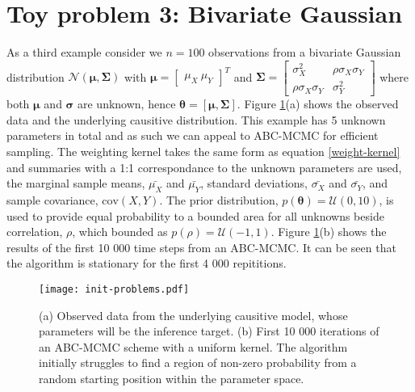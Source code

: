 \section{Toy problem 3: Bivariate Gaussian}
As a third example consider we $n = 100$ observations from a bivariate Gaussian distribution $\mathcal{N}(\bm{\mu},\bm{\Sigma})$ with $\bm{\mu} = \begin{bmatrix}
\mu_X\ \mu_Y
\end{bmatrix}^T$ and $\bm{\Sigma} = \begin{bmatrix}
\sigma^2_X & \rho\sigma_X\sigma_Y\\
\rho\sigma_X\sigma_Y & \sigma^2_Y
\end{bmatrix} $ where both $\bm{\mu}$ and $\bm{\sigma}$ are unknown, hence $\bm{\theta} = [\bm{\mu},\bm{\Sigma}]$. Figure \ref{init-qualms}(a) shows the observed data and the underlying causitive distribution. This example has 5 unknown parameters in total and as such we can appeal to ABC-MCMC for efficient sampling. The weighting kernel takes the same form as equation \ref{weight-kernel} and summaries with a 1:1 correspondance to the unknown parameters are used, the marginal sample means, $\bar{\mu_X}$ and $\bar{\mu_Y}$, standard deviations, $\bar{\sigma_X}$ and $\bar{\sigma_Y}$, and sample covariance, $\text{cov}(X,Y)$. The prior distribution, $p(\bm{\theta}) = \mathcal{U}(0,10)$, is used to provide equal probability to a bounded area for all unknowns beside correlation, $\rho$, which bounded as $p(\rho) = \mathcal{U}(-1,1)$. Figure \ref{init-qualms}(b) shows the results of the first 10 000 time steps from an ABC-MCMC. It can be seen that the algorithm is stationary for the first 4 000 repititions.\\

\begin{figure}[H]
	\centering
	\texttt{[image: init-problems.pdf]}
	\caption{(a) Observed data from the underlying causitive model, whose parameters will be the inference target. (b) First 10 000 iterations of an ABC-MCMC scheme with a uniform kernel. The algorithm initially struggles to find a region of non-zero probability from a random starting position within the parameter space.}
	\label{init-qualms}
\end{figure}


